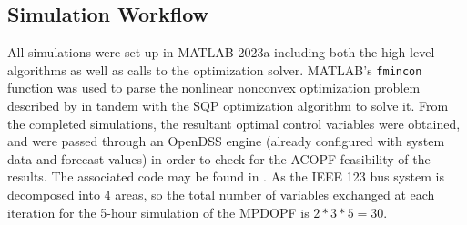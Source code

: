 \documentclass[../../outputs/main.tex]{subfiles}
\begin{document}
\def\ds{\rule{0pt}{1.5ex}} %



\subsection{Simulation Workflow}

All simulations were set up in MATLAB 2023a including both the high level algorithms as well as calls to the optimization solver. MATLAB's \texttt{fmincon} function was used to parse the nonlinear nonconvex optimization problem described by  in tandem with the SQP optimization algorithm to solve it. From the completed simulations, the resultant optimal control variables were obtained, and were passed through an OpenDSS engine (already configured with system data and forecast values) in order to check for the ACOPF feasibility of the results. 
The associated code may be found in \cite{MPOPFRepo}. 
As the IEEE 123 bus system is decomposed into 4 areas, so the total number of variables exchanged at each iteration for the 5-hour simulation of the MPDOPF is \(2*3*5=30\).

\end{document}
